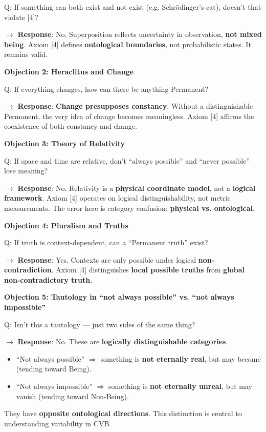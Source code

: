 \documentclass[12pt]{article}
\begin{document}
Q: If something can both exist and not exist (e.g. Schrödinger’s cat), doesn’t that violate [4]?

$\rightarrow$ \textbf{Response}: No. Superposition reflects uncertainty in observation, \textbf{not mixed being}. Axiom [4] defines \textbf{ontological boundaries}, not probabilistic states. It remains valid.

\bigskip

\textbf{Objection 2: Heraclitus and Change}

Q: If everything changes, how can there be anything Permanent?

$\rightarrow$ \textbf{Response}: \textbf{Change presupposes constancy}. Without a distinguishable Permanent, the very idea of change becomes meaningless. Axiom [4] affirms the coexistence of both constancy and change.

\bigskip

\textbf{Objection 3: Theory of Relativity}

Q: If space and time are relative, don’t ``always possible'' and ``never possible'' lose meaning?

$\rightarrow$ \textbf{Response}: No. Relativity is a \textbf{physical coordinate model}, not a \textbf{logical framework}. Axiom [4] operates on logical distinguishability, not metric measurements. The error here is category confusion: \textbf{physical vs. ontological}.

\bigskip

\textbf{Objection 4: Pluralism and Truths}

Q: If truth is context-dependent, can a ``Permanent truth'' exist?

$\rightarrow$ \textbf{Response}: Yes. Contexts are only possible under logical \textbf{non-contradiction}. Axiom [4] distinguishes \textbf{local possible truths} from \textbf{global non-contradictory truth}.

\bigskip

\textbf{Objection 5: Tautology in ``not always possible'' vs. ``not always impossible''}

Q: Isn’t this a tautology — just two sides of the same thing?

$\rightarrow$ \textbf{Response}: No. These are \textbf{logically distinguishable categories}.
\begin{itemize}
\item ``Not always possible'' $\Rightarrow$ something is \textbf{not eternally real}, but may become (tending toward Being).
\item ``Not always impossible'' $\Rightarrow$ something is \textbf{not eternally unreal}, but may vanish (tending toward Non-Being).
\end{itemize}
They have \textbf{opposite ontological directions}. This distinction is central to understanding variability in CVB.
\end{document}
